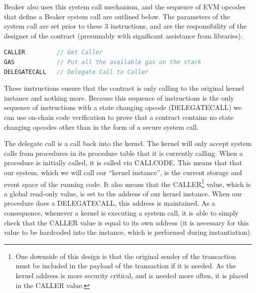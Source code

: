 \documentclass[english,a4paper]{article}
\begin{document}
Beaker also uses this system call mechanism, and the sequence of EVM opcodes
that define a Beaker system call are outlined below. The
parameters of the system call are set prior to these 3 instructions, and are the
responsibility of the designer of the contract (presumably with significant
assistance from libraries).

\begin{minipage}{\linewidth}
\begin{lstlisting}[language=c,commentstyle=\color{mygreen},basicstyle=\ttfamily,
  identifierstyle=\color{blue},
  caption=Sequence of steps to perform a system call.]
CALLER         // Get Caller
GAS            // Put all the available gas on the stack
DELEGATECALL   // Delegate Call to Caller
\end{lstlisting}
\end{minipage}

These instructions ensure that the contract is only calling to the
original kernel instance and nothing more. Because this sequence of
instructions is the only sequence of instructions with a state changing
opcode (DELEGATECALL) we can use on-chain code verification to prove
that a contract contains no state changing opcodes other than in the
form of a secure system call.

The delegate call is a call back into the kernel. The kernel will only
accept system calls from procedures in its procedure table that it is
currently calling. When a procedure is initially called, it is called
via CALLCODE. This means that that our system, which we will call our
``kernel instance'', is the current storage and event space of the
running code. It also means that the CALLER\footnote{One downside of this design
is that the original sender of the transaction must be included in the payload
of the transaction if it is needed. As the kernel address is more security
critical, and is needed more often, it is placed in the CALLER value.} value,
which is a global
read-only value, is set to the address of our kernel instance. When our
procedure does a DELEGATECALL, this address is maintained. As a
consequence, whenever a kernel is executing a system call, it is able to
simply check that the CALLER value is equal to its own address (it is
necessary for this value to be hardcoded into the instance, which is
performed during instantiation).
\end{document}
